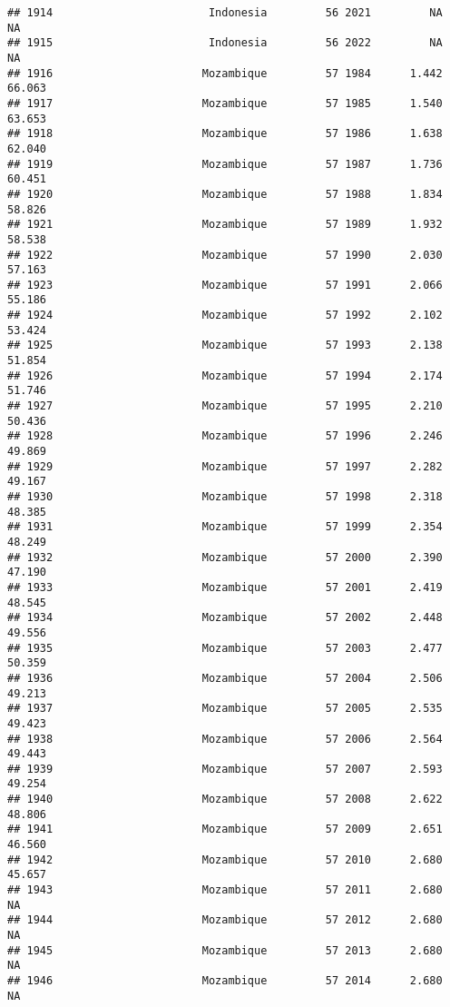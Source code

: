 \documentclass[
]{article}
\begin{document}
\begin{verbatim}
## 1914                        Indonesia         56 2021         NA         NA
## 1915                        Indonesia         56 2022         NA         NA
## 1916                       Mozambique         57 1984      1.442     66.063
## 1917                       Mozambique         57 1985      1.540     63.653
## 1918                       Mozambique         57 1986      1.638     62.040
## 1919                       Mozambique         57 1987      1.736     60.451
## 1920                       Mozambique         57 1988      1.834     58.826
## 1921                       Mozambique         57 1989      1.932     58.538
## 1922                       Mozambique         57 1990      2.030     57.163
## 1923                       Mozambique         57 1991      2.066     55.186
## 1924                       Mozambique         57 1992      2.102     53.424
## 1925                       Mozambique         57 1993      2.138     51.854
## 1926                       Mozambique         57 1994      2.174     51.746
## 1927                       Mozambique         57 1995      2.210     50.436
## 1928                       Mozambique         57 1996      2.246     49.869
## 1929                       Mozambique         57 1997      2.282     49.167
## 1930                       Mozambique         57 1998      2.318     48.385
## 1931                       Mozambique         57 1999      2.354     48.249
## 1932                       Mozambique         57 2000      2.390     47.190
## 1933                       Mozambique         57 2001      2.419     48.545
## 1934                       Mozambique         57 2002      2.448     49.556
## 1935                       Mozambique         57 2003      2.477     50.359
## 1936                       Mozambique         57 2004      2.506     49.213
## 1937                       Mozambique         57 2005      2.535     49.423
## 1938                       Mozambique         57 2006      2.564     49.443
## 1939                       Mozambique         57 2007      2.593     49.254
## 1940                       Mozambique         57 2008      2.622     48.806
## 1941                       Mozambique         57 2009      2.651     46.560
## 1942                       Mozambique         57 2010      2.680     45.657
## 1943                       Mozambique         57 2011      2.680         NA
## 1944                       Mozambique         57 2012      2.680         NA
## 1945                       Mozambique         57 2013      2.680         NA
## 1946                       Mozambique         57 2014      2.680         NA

\end{verbatim}
\end{document}
